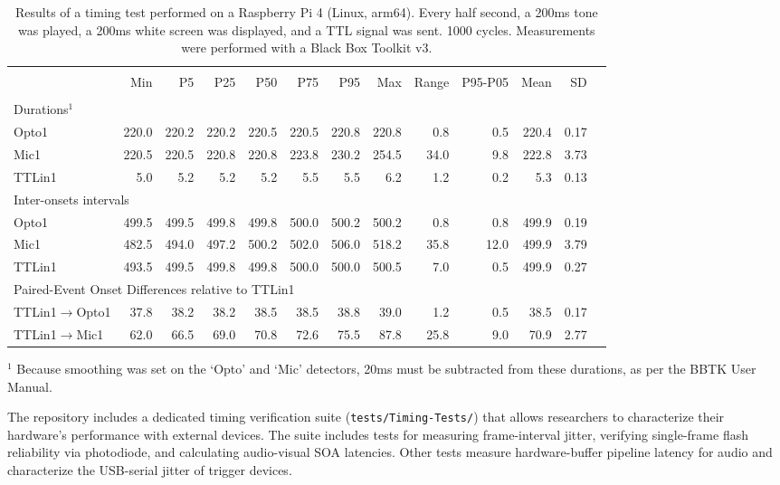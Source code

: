 \documentclass[man,a4paper]{apa7}
\begin{document}
\begin{table}[tb]
  \caption{Results of a timing test performed on a Raspberry Pi 4
    (Linux, arm64). Every half second, a 200ms tone was played, a 200ms white screen was displayed, and a TTL signal was sent. 1000 cycles. Measurements were performed with a Black Box Toolkit v3. }
\label{timings}
\footnotesize
  \begin{tabular}{lrrrrrrrrrrrr}
\hline \hline \\
    &     Min &  P5 &   P25 &  P50 &  P75 &  P95 &  Max &  Range & P95-P05 & Mean & SD \\
    \cline{2-11} \\
\multicolumn{11}{l}{Durations$^1$} \\
Opto1  & 220.0 & 220.2 & 220.2 & 220.5 & 220.5 & 220.8 & 220.8 &
0.8 & 0.5 & 220.4 & 0.17 \\
Mic1  & 220.5 & 220.5 & 220.8 & 220.8 & 223.8 & 230.2 & 254.5 &
34.0 & 9.8 & 222.8 & 3.73 \\
TTLin1  & 5.0 & 5.2 & 5.2 & 5.2 & 5.5 & 5.5 & 6.2 & 1.2 & 0.2 &
5.3 & 0.13 \\

\multicolumn{11}{l}{Inter-onsets intervals} \\
Opto1 & 499.5 & 499.5 & 499.8 & 499.8 & 500.0 & 500.2 & 500.2 &
0.8 & 0.8 & 499.9 & 0.19 \\
Mic1 & 482.5 & 494.0 & 497.2 & 500.2 & 502.0 & 506.0 & 518.2 &
35.8 & 12.0 & 499.9 & 3.79 \\
TTLin1 & 493.5 & 499.5 & 499.8 & 499.8 & 500.0 & 500.0 & 500.5 &
7.0 & 0.5 & 499.9 & 0.27 \\

\multicolumn{11}{l}{Paired-Event Onset Differences relative to TTLin1} \\

TTLin1$\rightarrow$Opto1 &  37.8 & 38.2 & 38.2 & 38.5 & 38.5 & 38.8 & 39.0 &
1.2 & 0.5 & 38.5 & 0.17 \\

TTLin1$\rightarrow$Mic1 &  62.0 & 66.5 & 69.0 & 70.8 & 72.6 & 75.5 & 87.8 &
             25.8 & 9.0 & 70.9 & 2.77 \\ \hline
  \end{tabular}

  {\footnotesize{$^1$ Because smoothing was set on the
    `Opto' and `Mic' detectors, 20ms must be subtracted from
    these durations, as per the BBTK User Manual.}}
\end{table}


The repository includes a dedicated timing verification suite
(\texttt{tests/Timing-Tests/}) that allows researchers to characterize
their hardware's performance with external devices. The suite includes
tests for measuring frame-interval jitter, verifying single-frame
flash reliability via photodiode, and calculating audio-visual SOA
latencies. Other tests measure hardware-buffer pipeline latency for
audio and characterize the USB-serial jitter of trigger devices.
\end{document}
